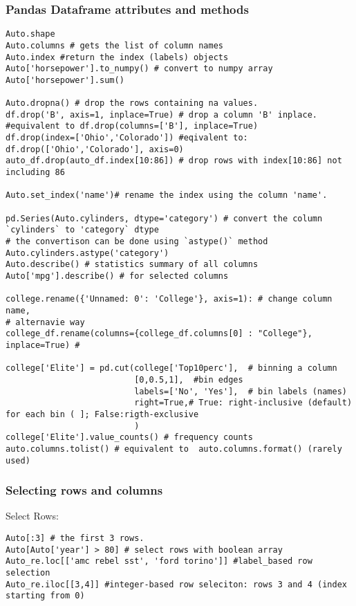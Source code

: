 \documentclass[
  letterpaper,
  DIV=11,
  numbers=noendperiod]{scrreprt}
\begin{document}
\subsubsection{Pandas Dataframe attributes and
methods}\label{pandas-dataframe-attributes-and-methods}

\begin{verbatim}
Auto.shape
Auto.columns # gets the list of column names
Auto.index #return the index (labels) objects
Auto['horsepower'].to_numpy() # convert to numpy array
Auto['horsepower'].sum()

Auto.dropna() # drop the rows containing na values. 
df.drop('B', axis=1, inplace=True) # drop a column 'B' inplace. 
#equivalent to df.drop(columns=['B'], inplace=True)
df.drop(index=['Ohio','Colorado']) #eqivalent to: df.drop(['Ohio','Colorado'], axis=0)
auto_df.drop(auto_df.index[10:86]) # drop rows with index[10:86] not including 86

Auto.set_index('name')# rename the index using the column 'name'.

pd.Series(Auto.cylinders, dtype='category') # convert the column `cylinders` to 'category` dtype
# the convertison can be done using `astype()` method
Auto.cylinders.astype('category')
Auto.describe() # statistics summary of all columns
Auto['mpg'].describe() # for selected columns

college.rename({'Unnamed: 0': 'College'}, axis=1): # change column name, 
# alternavie way
college_df.rename(columns={college_df.columns[0] : "College"}, inplace=True) #

college['Elite'] = pd.cut(college['Top10perc'],  # binning a column
                          [0,0.5,1],  #bin edges
                          labels=['No', 'Yes'],  # bin labels (names)
                          right=True,# True: right-inclusive (default) for each bin ( ]; False:rigth-exclusive 
                          )   
college['Elite'].value_counts() # frequency counts
auto.columns.tolist() # equivalent to  auto.columns.format() (rarely used)
\end{verbatim}

\subsubsection{Selecting rows and
columns}\label{selecting-rows-and-columns}

Select Rows:

\begin{verbatim}
Auto[:3] # the first 3 rows. 
Auto[Auto['year'] > 80] # select rows with boolean array
Auto_re.loc[['amc rebel sst', 'ford torino']] #label_based row selection
Auto_re.iloc[[3,4]] #integer-based row seleciton: rows 3 and 4 (index starting from 0)
\end{verbatim}
\end{document}
